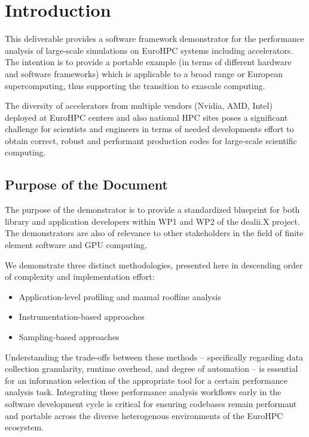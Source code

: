 \documentclass[a4paper,12pt]{article}
\begin{document}
\vspace*{2cm}

\disclaimer

\newpage

\tableofcontents %

\newpage

\section{{Introduction}}

This deliverable provides a software framework demonstrator for the performance
analysis of large-scale simulations on EuroHPC systems including accelerators.
The intention is to provide a portable example (in terms of different hardware and software frameworks)
which is applicable to a broad range or European supercomputing,
thus supporting the transition to exascale computing.

The diversity of accelerators from multiple vendors (Nvidia, AMD, Intel) deployed
at EuroHPC centers and also national HPC sites poses a significant challenge
for scientists and engineers in terms of needed developments effort to obtain
correct, robust and performant production codes for large-scale scientific computing.

\subsection{{Purpose of the Document}}

The purpose of the demonstrator is to provide a standardized blueprint for
both library and application developers within WP1 and WP2 of the dealii.X project.
The demonstrators are also of relevance to other stakeholders in the field of finite element
software and GPU computing.

We demonstrate three distinct methodologies, presented here in descending order
of complexity and implementation effort:
\begin{itemize}
    \item Application-level profiling and manual roofline analysis
    \item Instrumentation-based approaches
    \item Sampling-based approaches
\end{itemize}

Understanding the trade-offs between these methods -- specifically regarding data
collection granularity, runtime overhead, and degree of automation -- is essential
for an information selection of the appropriate tool for a certain performance
analysis task.
Integrating these performance analysis workflows early in the software development
cycle is critical for ensuring codebases remain performant and portable across the
diverse heterogenous environments of the EuroHPC ecosystem.
\end{document}

